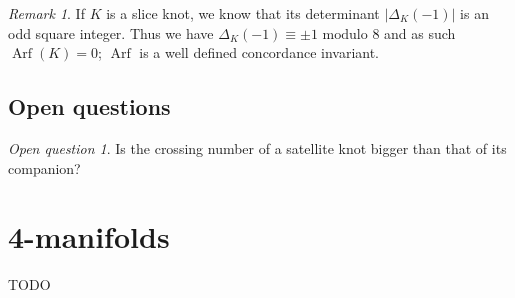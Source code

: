 \documentclass{tufte-book} %
\theoremstyle{definition}
\theoremstyle{remark}
\newtheorem{remark}{Remark}
\newtheorem{openquestion}{Open question}
\DeclareMathOperator{\Arf}{Arf}
\begin{document}
\begin{remark}
	If $K$ is a slice knot, we know that its determinant
	$| \Delta_{K}(-1) |$ is an odd square integer.
	Thus we have $\Delta_{K}(-1) \equiv \pm 1 \textrm{ modulo } 8$
	and as such $\Arf(K) = 0$; $\Arf$ is a well defined concordance invariant.
\end{remark}




\section{Open questions}

\begin{openquestion}
	Is the crossing number of a satellite knot bigger than that of its companion?
\end{openquestion}

\chapter{4-manifolds}

TODO


\backmatter




\printindex %
\end{document}
